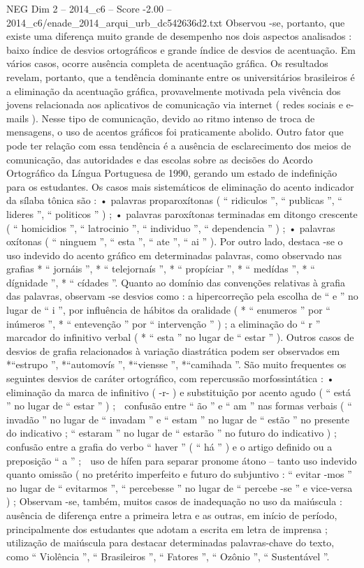 \begin{textsample}{NEG Dim 2 – 2014\_c6 – Score -2.00 – 2014\_c6/enade\_2014\_arqui\_urb\_dc542636d2.txt}
Observou -se, portanto, que existe uma diferença muito grande de desempenho nos dois aspectos analisados : baixo índice de desvios ortográficos e grande índice de desvios de acentuação.
Em vários casos, ocorre ausência completa de acentuação gráfica.
Os resultados revelam, portanto, que a tendência dominante entre os universitários brasileiros é a eliminação da acentuação gráfica, provavelmente motivada pela vivência dos jovens relacionada aos aplicativos de comunicação via internet ( redes sociais e e-mails ).
Nesse tipo de comunicação, devido ao ritmo intenso de troca de mensagens, o uso de acentos gráficos foi praticamente abolido.
Outro fator que pode ter relação com essa tendência é a ausência de esclarecimento dos meios de comunicação, das autoridades e das escolas sobre as decisões do Acordo Ortográfico da Língua Portuguesa de 1990, gerando um estado de indefinição para os estudantes.
Os casos mais sistemáticos de eliminação do acento indicador da sílaba tônica são : • palavras proparoxítonas ( “ ridiculos ”, “ publicas ”, “ lideres ”, “ politicos ” ) ; • palavras paroxítonas terminadas em ditongo crescente ( “ homicidios ”, “ latrocinio ”, “ individuo ”, “ dependencia ” ) ; • palavras oxítonas ( “ ninguem ”, “ esta ”, “ ate ”, “ ai ” ).
Por outro lado, destaca -se o uso indevido do acento gráfico em determinadas palavras, como observado nas grafias * “ jornáis ”, * “ telejornaís ”, * “ propíciar ”, * “ medídas ”, * “ dígnidade ”, * “ cídades ”.
Quanto ao domínio das convenções relativas à grafia das palavras, observam -se desvios como : a hipercorreção pela escolha de “ e ” no lugar de “ i ”, por influência de hábitos da oralidade ( * “ enumeros ” por “ inúmeros ”, * “ entevenção ” por “ intervenção ” ) ; a eliminação do “ r ” marcador do infinitivo verbal ( * “ esta ” no lugar de “ estar ” ).
Outros casos de desvios de grafia relacionados à variação diastrática podem ser observados em *“estrupo ”, *“automovís ”, *“viensse ”, *“camihada ”.
São muito frequentes os seguintes desvios de caráter ortográfico, com repercussão morfossintática : • eliminação da marca de infinitivo ( -r- ) e substituição por acento agudo ( “ está ” no lugar de “ estar ” ) ;  confusão entre “ ão ” e “ am ” nas formas verbais ( “ invadão ” no lugar de “ invadam ” e “ estam ” no lugar de “ estão ” no presente do indicativo ; “ estaram ” no lugar de “ estarão ” no futuro do indicativo ) ;  confusão entre a grafia do verbo “ haver ” ( “ há ” ) e o artigo definido ou a preposição “ a ” ;  uso de hífen para separar pronome átono – tanto uso indevido quanto omissão ( no pretérito imperfeito e futuro do subjuntivo : “ evitar -mos ” no lugar de “ evitarmos ”, “ percebesse ” no lugar de “ percebe -se ” e vice-versa ) ; Observam -se, também, muitos casos de inadequação no uso da maiúscula : ausência de diferença entre a primeira letra e as outras, em início de período, principalmente dos estudantes que adotam a escrita em letra de imprensa ; utilização de maiúscula para destacar determinadas palavras-chave do texto, como “ Violência ”, “ Brasileiros ”, “ Fatores ”, “ Ozônio ”, “ Sustentável ”.

\end{textsample}
